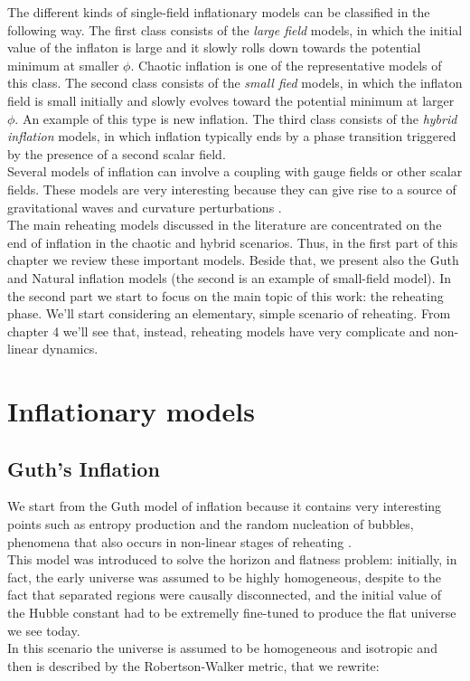 \documentclass[11pt,a4paper,twoside]{book}
\begin{document}
The different kinds of single-field inflationary models can be classified in the following way. The first class consists of the \textit{large field} models, in which the initial value of the inflaton is large and it slowly rolls down towards  the potential minimum at smaller $\phi$. Chaotic inflation is one of the representative models of this class. The second class consists of the \textit{small fied} models, in which the inflaton field is small initially and slowly evolves toward the potential minimum at larger $\phi$. An example of this type is new inflation. The third class consists of the \textit{hybrid inflation} models, in which inflation typically ends by a phase transition triggered by the presence of a second scalar field.\\
Several models of inflation can involve a coupling with gauge fields or other scalar fields. These models are very interesting because they can give rise to a source of gravitational waves and curvature perturbations \cite{GWFromInflation:Intro}. \\
The main reheating models discussed in the literature are concentrated on the end of inflation in the chaotic and hybrid scenarios. Thus, in the first part of this chapter we review these important models. Beside that, we present also the Guth and Natural inflation models (the second is an example of small-field model). In the second part  we start to focus on the main topic of this work: the reheating phase. We'll start considering an elementary, simple scenario of reheating. From chapter 4 we'll see that, instead, reheating models have very complicate and non-linear dynamics. 

\section{Inflationary models}
\subsection{Guth's Inflation}
We start from the Guth model of inflation because it contains very interesting points such as entropy production and the random nucleation of bubbles, phenomena that also occurs in non-linear stages of reheating \cite{Guth:Intro}.\\
This model was introduced to solve the horizon and flatness problem: initially, in fact, the early universe was assumed to be highly homogeneous, despite to the fact that separated regions were causally disconnected, and the initial value of the Hubble constant had to be extremelly fine-tuned to produce the flat universe we see today.\\
In this scenario the universe is assumed to be homogeneous and isotropic and then is described by the Robertson-Walker metric, that we rewrite:
\end{document}
